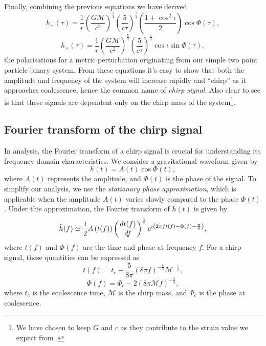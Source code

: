 Finally, combining the previous equations we have derived
%
\begin{equation}
    h_{+}(\tau) = \frac{1}{r}\left(\frac{G\mathcal{M}}{c^{2}}\right)^{\frac{5}{4}}\left(\frac{5}{c\tau}\right)^{\frac{1}{4}}\left(\frac{1+\cos^{2}\iota}{2}\right)\cos\Phi(\tau),
\end{equation}
%
\begin{equation}
    h_{\times}(\tau) = \frac{1}{r}\left(\frac{G\mathcal{M}}{c^{2}}\right)^{\frac{5}{4}}\left(\frac{5}{c\tau}\right)^{\frac{1}{4}}\cos\iota\sin\Phi(\tau),
\end{equation}
%
the \gwadj polarisations for a metric perturbation originating from our simple two point particle binary system. From these equations it's easy to show that both the amplitude and frequency of the system will increase rapidly and ``chirp'' as it approaches coalescence, hence the common name of \textit{chirp signal}. Also clear to see is that these \gwadj signals are dependent only on the chirp mass of the system\footnote{We have chosen to keep $G$ and $c$ as they contribute to the strain value we expect from \gws.}.

\subsection{\label{1:sec:fourier_transform_chirp}Fourier transform of the chirp signal}

In \gwadj analysis, the Fourier transform of a chirp signal is crucial for understanding its frequency domain characteristics. We consider a gravitational waveform given by
%
\begin{equation}
    h(t) = A(t) \cos \Phi(t),
\end{equation}
%
where \( A(t) \) represents the amplitude, and \( \Phi(t) \) is the phase of the signal. To simplify our analysis, we use the \textit{stationary phase approximation}, which is applicable when the amplitude \( A(t) \) varies slowly compared to the phase \( \Phi(t) \). Under this approximation, the Fourier transform of \( h(t) \) is given by
%
\begin{equation}
    \Tilde{h}(f) \simeq \frac{1}{2} A\left(t(f)\right) \left(\frac{dt(f)}{df}\right)^{\frac{1}{2}} {\rm e}^{i \left(2\pi f t(f) - \Phi(f) - \frac{\pi}{4}\right)},
\end{equation}
%
where \( t(f) \) and \( \Phi(f) \) are the time and phase at frequency \( f \). For a chirp signal, these quantities can be expressed as
%
\begin{equation}
    t(f) = t_c - \frac{5}{8\pi}\left(8\pi f\right)^{-\frac{8}{3}} \mathcal{M}^{-\frac{5}{3}},
\end{equation}
%
\begin{equation}
    \Phi(f) = \Phi_c - 2\left(8\pi \mathcal{M} f\right)^{-\frac{5}{3}},
\end{equation}
%
where \( t_c \) is the coalescence time, \( \mathcal{M} \) is the chirp mass, and \( \Phi_c \) is the phase at coalescence.

